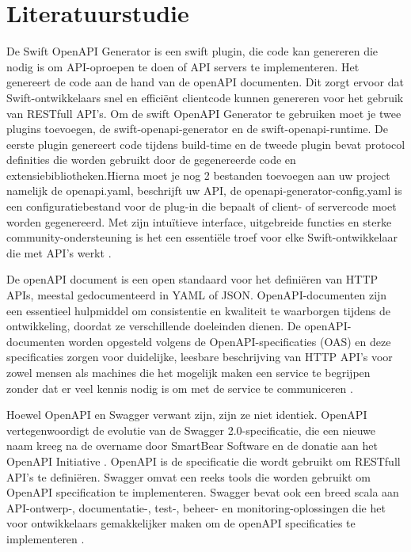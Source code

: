 \section{Literatuurstudie}%
\label{sec:literatuurstudie}
De Swift OpenAPI Generator is een swift plugin, die code kan genereren die nodig is om API-oproepen te doen of API servers te implementeren. Het genereert de code aan de hand van de openAPI documenten. Dit zorgt ervoor dat Swift-ontwikkelaars snel en efficiënt clientcode kunnen genereren voor het gebruik van RESTfull API’s. Om de swift OpenAPI Generator te gebruiken moet je twee plugins toevoegen, de swift-openapi-generator en de swift-openapi-runtime. De eerste plugin genereert code tijdens build-time en de tweede plugin bevat protocol definities die worden gebruikt door de gegenereerde code en extensiebibliotheken.Hierna moet je nog 2 bestanden toevoegen aan uw project namelijk de openapi.yaml, beschrijft uw API, de openapi-generator-config.yaml is een configuratiebestand voor de plug-in die bepaalt of client- of servercode moet worden gegenereerd. Met zijn intuïtieve interface, uitgebreide functies en sterke community-ondersteuning is het een essentiële troef voor elke Swift-ontwikkelaar die met API's werkt  \autocite{Dvorsky2023} . 

De openAPI document is een open standaard voor het definiëren van HTTP APIs, meestal gedocumenteerd in YAML of JSON. OpenAPI-documenten zijn een essentieel hulpmiddel om consistentie en kwaliteit te waarborgen tijdens de ontwikkeling, doordat ze verschillende doeleinden dienen. De openAPI-documenten worden opgesteld volgens de OpenAPI-specificaties (OAS) en deze specificaties zorgen voor duidelijke, leesbare beschrijving van HTTP API’s voor zowel mensen als machines die het mogelijk maken een service te begrijpen zonder dat er veel kennis nodig is om met de service te communiceren \autocite{Miller2020}. 

Hoewel OpenAPI en Swagger verwant zijn, zijn ze niet identiek. OpenAPI vertegenwoordigt de evolutie van de Swagger 2.0-specificatie, die een nieuwe naam kreeg na de overname door SmartBear Software en de donatie aan het OpenAPI Initiative \autocite{2023}. OpenAPI is de specificatie die wordt gebruikt om RESTfull API's te definiëren. Swagger omvat een reeks tools die worden gebruikt om OpenAPI specification te implementeren. Swagger bevat ook een breed scala aan API-ontwerp-, documentatie-, test-, beheer- en monitoring-oplossingen die het voor ontwikkelaars gemakkelijker maken om de openAPI specificaties te implementeren \autocite{ Pinkham2017}. 

